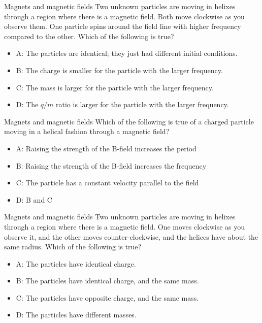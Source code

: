 \documentclass{beamer}
\begin{document}
\begin{frame}{Magnets and magnetic fields}
Two unknown particles are moving in helixes through a region where there is a magnetic field.  Both move clockwise as you observe them. One particle spins around the field line with higher frequency compared to the other.  Which of the following is true?
\begin{itemize}
\item A: The particles are identical; they just had different initial conditions.
\item B: The charge is smaller for the particle with the larger frequency.
\item C: The mass is larger for the particle with the larger frequency.
\item D: The $q/m$ ratio is larger for the particle with the larger frequency.
\end{itemize}
\end{frame}

\begin{frame}{Magnets and magnetic fields}
Which of the following is true of a charged particle moving in a helical fashion through a magnetic field?
\begin{itemize}
\item A: Raising the strength of the B-field increases the period
\item B: Raising the strength of the B-field increases the frequency
\item C: The particle has a constant velocity parallel to the field
\item D: B and C
\end{itemize}
\end{frame}

\begin{frame}{Magnets and magnetic fields}
Two unknown particles are moving in helixes through a region where there is a magnetic field.  One moves clockwise as you observe it, and the other moves counter-clockwise, and the helices have about the same radius.  Which of the following is true?
\begin{itemize}
\item A: The particles have identical charge.
\item B: The particles have identical charge, and the same mass.
\item C: The particles have opposite charge, and the same mass.
\item D: The particles have different masses.
\end{itemize}
\end{frame}
\end{document}
